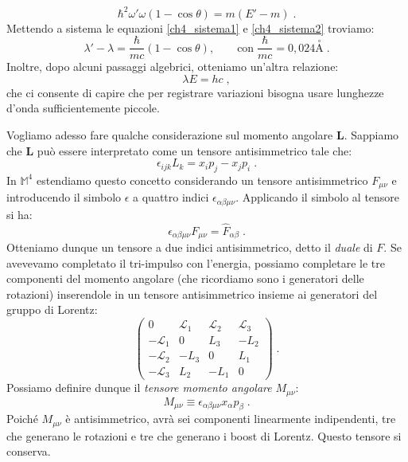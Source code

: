 \begin{exm}
\begin{equation}
 \hbar^2\omega'\omega(1-\cos\theta)=m(E'-m)\;. \label{ch4_sistema2}
\end{equation}
Mettendo a sistema le equazioni \eqref{ch4_sistema1} e \eqref{ch4_sistema2} troviamo:
\begin{equation}
 \lambda'-\lambda=\frac{\hbar}{mc}(1-\cos\theta),\qquad \mbox{con}\;\frac{\hbar}{mc}=0,024\stackrel{\circ}{\mathrm{A}}\;.
\end{equation}
Inoltre, dopo alcuni passaggi algebrici, otteniamo un'altra relazione:
\begin{equation}
 \lambda E=hc\;,
\end{equation}
che ci consente di capire che per registrare variazioni bisogna usare lunghezze d'onda sufficientemente piccole.
\end{exm}

Vogliamo adesso fare qualche considerazione sul momento angolare $\mathbf{L}$. Sappiamo che $\mathbf{L}$ può essere interpretato come un tensore antisimmetrico tale che:
\begin{equation}
\epsilon_{ijk}L_k=x_ip_j-x_jp_i\;.
\end{equation}
In $\mathbb{M}^4$ estendiamo questo concetto considerando un tensore antisimmetrico $F_{\mu\nu}$ e introducendo il simbolo $\epsilon$ a quattro indici $\epsilon_{\alpha\beta\mu\nu}$. Applicando il simbolo al tensore si ha:
\begin{equation}
 \epsilon_{\alpha\beta\mu\nu}F_{\mu\nu}=\hat{F}_{\alpha\beta}\;.
\end{equation}
Otteniamo dunque un tensore a due indici antisimmetrico, detto il \textit{duale} di $F$. Se avevevamo completato il tri-impulso con 
l'energia, possiamo completare le tre componenti del momento angolare (che ricordiamo sono i generatori delle rotazioni) inserendole in
 un tensore antisimmetrico insieme ai generatori del gruppo di Lorentz:
\begin{equation}
\left(\begin{matrix}
       0 & \mathcal{L}_1 & \mathcal{L}_2 & \mathcal{L}_3 \\
-\mathcal{L}_1 & 0 & L_3 & -L_2 \\
-\mathcal{L}_2 & -L_3 & 0 & L_1 \\
-\mathcal{L}_3 & L_2 & -L_1 & 0
      \end{matrix}\right)\;.
\end{equation}
Possiamo definire dunque il \textit{tensore momento angolare} $M_{\mu\nu}$:
\begin{equation}
 M_{\mu\nu}\equiv \epsilon_{\alpha\beta\mu\nu}x_{\alpha}p_{\beta}\;.
\end{equation}
Poiché $M_{\mu\nu}$ è antisimmetrico, avrà sei componenti linearmente indipendenti, tre che generano le rotazioni e tre che generano i 
boost di Lorentz. Questo tensore si conserva.


